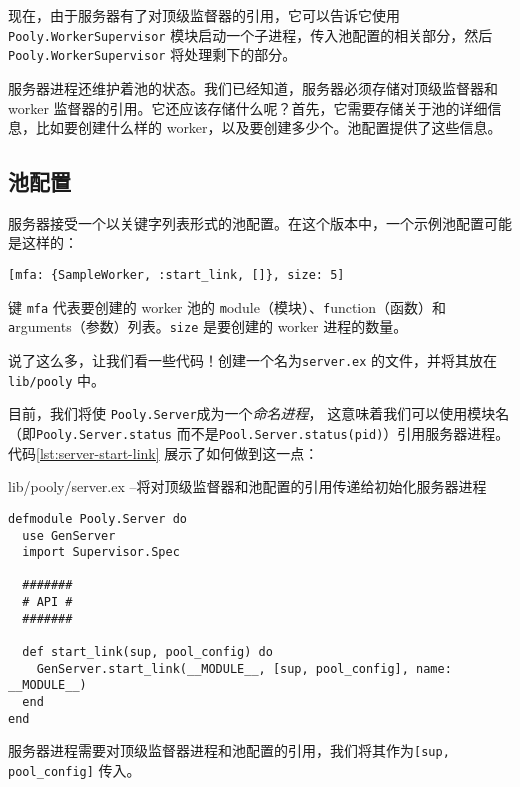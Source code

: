 现在，由于服务器有了对顶级监督器的引用，它可以告诉它使用
\texttt{Pooly.WorkerSupervisor}
模块启动一个子进程，传入池配置的相关部分，然后
\texttt{Pooly.WorkerSupervisor} 将处理剩下的部分。

服务器进程还维护着池的状态。我们已经知道，服务器必须存储对顶级监督器和
worker
监督器的引用。它还应该存储什么呢？首先，它需要存储关于池的详细信息，比如要创建什么样的
worker，以及要创建多少个。池配置提供了这些信息。

 \subsection{ 池配置}

服务器接受一个以关键字列表形式的池配置。在这个版本中，一个示例池配置可能是这样的：

\begin{code}{}
\begin{verbatim}
[mfa: {SampleWorker, :start_link, []}, size: 5]
\end{verbatim}
\end{code}

键 \texttt{mfa} 代表要创建的 worker 池的
\texttt{m}odule（模块）、\texttt{f}unction（函数）和
\texttt{a}rguments（参数）列表。\texttt{size}
是要创建的 worker 进程的数量。

说了这么多，让我们看一些代码！创建一个名为\texttt{server.ex} 的文件，并将其放在\texttt{lib/pooly} 中。

目前，我们将使 \texttt{Pooly.Server}成为一个\emph{命名进程}，
这意味着我们可以使用模块名（即\texttt{Pooly.Server.status} 而不是\texttt{Pool.Server.status(pid)}）引用服务器进程。
代码\ref{lst:server-start-link} 展示了如何做到这一点：


\begin{code}{lib/pooly/server.ex --将对顶级监督器和池配置的引用传递给初始化服务器进程}

\begin{verbatim}
defmodule Pooly.Server do
  use GenServer
  import Supervisor.Spec

  #######
  # API #
  #######

  def start_link(sup, pool_config) do
    GenServer.start_link(__MODULE__, [sup, pool_config], name: __MODULE__)
  end
end
\end{verbatim}
\label{lst:server-start-link}
\end{code}

服务器进程需要对顶级监督器进程和池配置的引用，我们将其作为\texttt{[sup, pool\_config]} 传入。

